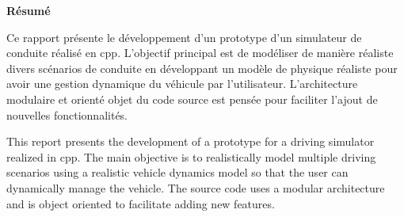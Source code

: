 \documentclass[a4paper,12pt]{report}
\begin{document}
    \clearpage

    \vspace*{\fill}
    \begin{center}
{}
    {\Large \textbf{Résumé}}
    \end{center}
    \bigskip
    \noindent
    \begin{minipage}{\textwidth}
        Ce rapport présente le développement d'un prototype d'un simulateur de conduite réalisé en \gls{cpp}.
        L'objectif principal est de modéliser de manière réaliste divers scénarios de conduite en développant un modèle de physique réaliste pour avoir une gestion dynamique du véhicule par l'utilisateur.
        L'architecture modulaire et orienté objet du code source est pensée pour faciliter l'ajout de nouvelles fonctionnalités.

        \bigskip

        This report presents the development of a prototype for a driving simulator realized in \gls{cpp}.
        The main objective is to realistically model multiple driving scenarios using a realistic vehicle dynamics model so that the user can dynamically manage the vehicle.
        The source code uses a modular architecture and is object oriented to facilitate adding new features.
    \end{minipage}
    \vspace*{\fill} %
    \clearpage
\end{document}
